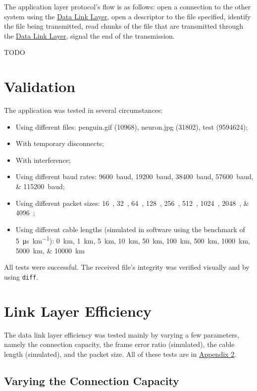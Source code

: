 \documentclass[11pt,a4paper,twocolumn]{article}
\begin{document}
The application layer protocol's flow is as follows:
open a connection to the other system using the \hyperref[sec:dll]{Data Link Layer},
open a descriptor to the file specified,
identify the file being transmitted,
read chunks of the file that are transmitted through the \hyperref[sec:dll]{Data Link Layer},
signal the end of the transmission.

TODO

\section{Validation}

The application was tested in several circumstances:

\begin{itemize}
    \item Using different files: penguin.gif (\qty{10968}{\byte}), neuron.jpg (\qty{31802}{\byte}), test (\qty{9594624}{\byte});
    \item With temporary disconnects;
    \item With interference;
    \item Using different baud rates: \qtylist{9600;19200;38400;57600;115200}{baud};
    \item Using different packet sizes: \qtylist{16;32;64;128;256;512;1024;2048;4096}{\byte};
    \item Using different cable lengths (simulated in software using the benchmark of \qty[per-mode=symbol]{5}{\micro\second\per\kilo\metre}): \qtylist{0;1;5;10;50;100;500;1000;5000;10000}{\kilo\metre}
\end{itemize}

All tests were successful.
The received file's integrity was verified visually and by using \lstinline{diff}.

\section{Link Layer Efficiency}

The data link layer efficiency was tested mainly by varying a few parameters, namely the connection capacity, the frame error ratio (simulated), the cable length (simulated), and the packet size.
All of these tests are in \href{sec:a2}{Appendix 2}.

\subsection{Varying the Connection Capacity}
\end{document}
